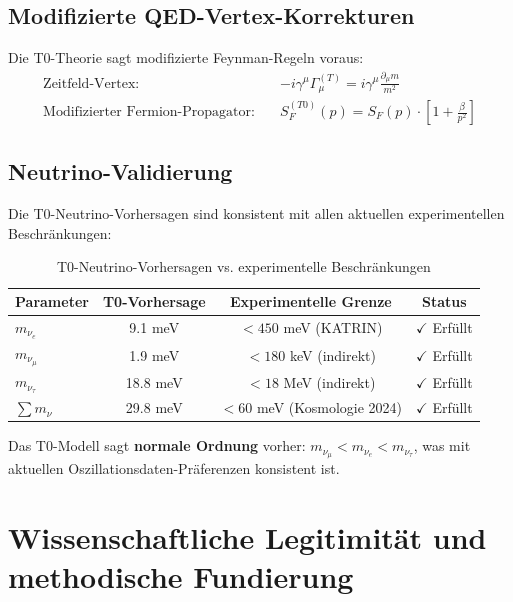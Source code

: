 	\subsection{Modifizierte QED-Vertex-Korrekturen}
	\label{subsec:qed_corrections}
	
	Die T0-Theorie sagt modifizierte Feynman-Regeln voraus:
	\begin{align}
		\text{Zeitfeld-Vertex:} \quad &-i\gamma^\mu\Gamma_\mu^{(T)} = i\gamma^\mu\frac{\partial_\mu m}{m^2} \\
		\text{Modifizierter Fermion-Propagator:} \quad &S_F^{(T0)}(p) = S_F(p) \cdot \left[1 + \frac{\beta}{p^2}\right]
	\end{align}
	
	\subsection{Neutrino-Validierung}
	\label{subsec:neutrino_validation}
	
	Die T0-Neutrino-Vorhersagen sind konsistent mit allen aktuellen experimentellen Beschränkungen:
	
	\begin{table}[H]
		\centering
		\begin{tabular}{lccc}
			\toprule
			\textbf{Parameter} & \textbf{T0-Vorhersage} & \textbf{Experimentelle Grenze} & \textbf{Status} \\
			\midrule
			$m_{\nu_e}$ & 9.1 meV & $< 450$ meV (KATRIN) & $\checkmark$ Erfüllt \\
			$m_{\nu_\mu}$ & 1.9 meV & $< 180$ keV (indirekt) & $\checkmark$ Erfüllt \\
			$m_{\nu_\tau}$ & 18.8 meV & $< 18$ MeV (indirekt) & $\checkmark$ Erfüllt \\
			$\sum m_\nu$ & 29.8 meV & $< 60$ meV (Kosmologie 2024) & $\checkmark$ Erfüllt \\
			\bottomrule
		\end{tabular}
		\caption{T0-Neutrino-Vorhersagen vs. experimentelle Beschränkungen}
		\label{tab:neutrino_validation}
	\end{table}
	
	\begin{important}
		Das T0-Modell sagt \textbf{normale Ordnung} vorher: $m_{\nu_\mu} < m_{\nu_e} < m_{\nu_\tau}$, was mit aktuellen Oszillationsdaten-Präferenzen konsistent ist.
	\end{important}
	
	\section{Wissenschaftliche Legitimität und methodische Fundierung}
	\label{sec:wissenschaftliche_legitimitaet}
	
